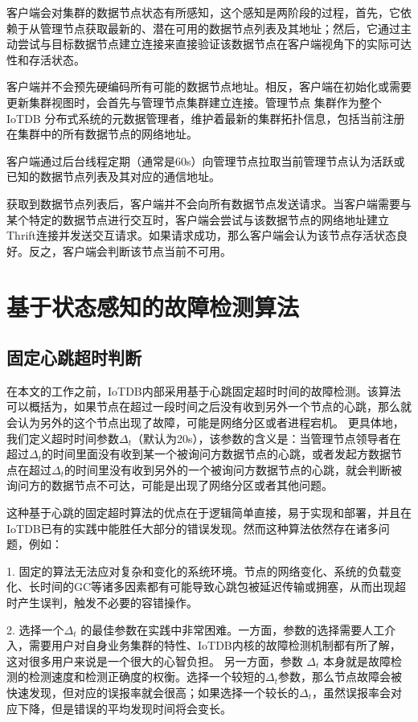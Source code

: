 客户端会对集群的数据节点状态有所感知，这个感知是两阶段的过程，首先，它依赖于从管理节点获取最新的、潜在可用的数据节点列表及其地址；然后，它通过主动尝试与目标数据节点建立连接来直接验证该数据节点在客户端视角下的实际可达性和存活状态。

客户端并不会预先硬编码所有可能的数据节点地址。相反，客户端在初始化或需要更新集群视图时，会首先与管理节点集群建立连接。管理节点 集群作为整个 IoTDB 分布式系统的元数据管理者，维护着最新的集群拓扑信息，包括当前注册在集群中的所有数据节点的网络地址。

客户端通过后台线程定期（通常是60s）向管理节点拉取当前管理节点认为活跃或已知的数据节点列表及其对应的通信地址。

获取到数据节点列表后，客户端并不会向所有数据节点发送请求。当客户端需要与某个特定的数据节点进行交互时，客户端会尝试与该数据节点的网络地址建立Thrift连接并发送交互请求。如果请求成功，那么客户端会认为该节点存活状态良好。反之，客户端会判断该节点当前不可用。

\section{基于状态感知的故障检测算法}\label{failure_detection}

\subsection{固定心跳超时判断}\label{failure_detection_timeout_fix}

在本文的工作之前，IoTDB内部采用基于心跳固定超时时间的故障检测。该算法可以概括为，如果节点在超过一段时间之后没有收到另外一个节点的心跳，那么就会认为另外的这个节点出现了故障，可能是网络分区或者进程宕机。
更具体地，我们定义超时时间参数$\Delta_{t}$（默认为20s），该参数的含义是：当管理节点领导者在超过$\Delta_{t}$的时间里面没有收到某一个被询问方数据节点的心跳，或者发起方数据节点在超过$\Delta_{t}$的时间里没有收到另外的一个被询问方数据节点的心跳，就会判断被询问方的数据节点不可达，可能是出现了网络分区或者其他问题。

这种基于心跳的固定超时算法的优点在于逻辑简单直接，易于实现和部署，并且在IoTDB已有的实践中能胜任大部分的错误发现。然而这种算法依然存在诸多问题，例如：

1. 固定的算法无法应对复杂和变化的系统环境。节点的网络变化、系统的负载变化、长时间的GC等诸多因素都有可能导致心跳包被延迟传输或拥塞，从而出现超时产生误判，触发不必要的容错操作。

2. 选择一个$\Delta_{t}$ 的最佳参数在实践中非常困难。一方面，参数的选择需要人工介入，需要用户对自身业务集群的特性、IoTDB内核的故障检测机制都有所了解，这对很多用户来说是一个很大的心智负担。
另一方面，参数 $\Delta_{t}$ 本身就是故障检测的检测速度和检测正确度的权衡。选择一个较短的$\Delta_{t}$参数，那么节点故障会被快速发现，但对应的误报率就会很高；如果选择一个较长的$\Delta_{t}$，虽然误报率会对应下降，但是错误的平均发现时间将会变长。


